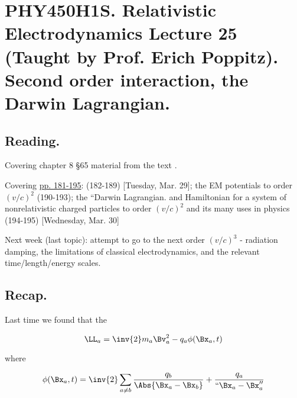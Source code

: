 
%

\chapter{PHY450H1S.  Relativistic Electrodynamics Lecture 25 (Taught by Prof. Erich Poppitz).  Second order interaction, the Darwin Lagrangian.}
\label{chap:relativisticElectrodynamicsL25}
{}
\date{Mar 31, 2011}

\beginArtNoToc

\section{Reading.}

Covering chapter 8 \S 65 material from the text \cite{landau1980classical}.

Covering \href{http://www.physics.utoronto.ca/~poppitz/epoppitz/PHY450_files/RelEMpp181-195.pdf}{pp. 181-195}: (182-189) [Tuesday, Mar. 29]; the EM potentials to order $(v/c)^2$ (190-193); the ``Darwin Lagrangian.  and Hamiltonian for a system of nonrelativistic charged particles to order $(v/c)^2$ and its many uses in physics (194-195) [Wednesday, Mar. 30]

Next week (last topic): attempt to go to the next order $(v/c)^3$ - radiation damping, the limitations of classical electrodynamics, and the relevant time/length/energy scales.

\section{Recap.}

Last time we found that the 

\begin{equation}\label{eqn:relativisticElectrodynamicsL25:10}
\LL_a = \inv{2} m_a \Bv_a^2 - q_a \phi(\Bx_a, t)
\end{equation}

where

\begin{equation}\label{eqn:relativisticElectrodynamicsL25:30}
\phi(\Bx_a, t) = \inv{2} \sum_{a \ne b} \frac{q_b }{\Abs{\Bx_a - \Bx_b}}
+ \frac{q_a}{``\Bx_a - \Bx_a''}
\end{equation}

